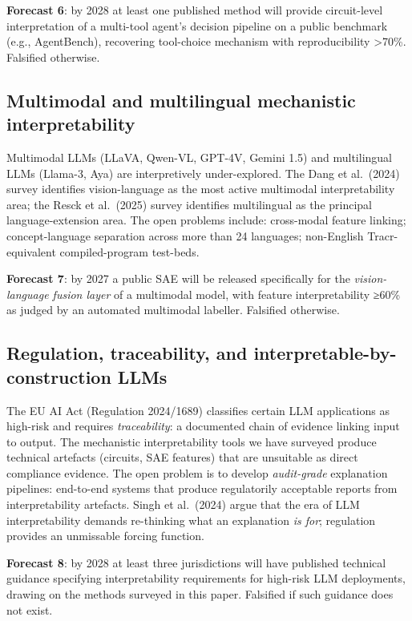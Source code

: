 \textbf{Forecast 6}: by 2028 at least one published method will provide circuit-level interpretation of a multi-tool agent's decision pipeline on a public benchmark (e.g., AgentBench), recovering tool-choice mechanism with reproducibility \textgreater70\%. Falsified otherwise.

\subsection{Multimodal and multilingual mechanistic interpretability}\label{multimodal-and-multilingual-mechanistic-interpretability}

Multimodal LLMs (LLaVA, Qwen-VL, GPT-4V, Gemini 1.5) and multilingual LLMs (Llama-3, Aya) are interpretively under-explored. The Dang et al.~(2024) survey identifies vision-language as the most active multimodal interpretability area; the Resck et al.~(2025) survey identifies multilingual as the principal language-extension area. The open problems include: cross-modal feature linking; concept-language separation across more than 24 languages; non-English Tracr-equivalent compiled-program test-beds.

\textbf{Forecast 7}: by 2027 a public SAE will be released specifically for the \emph{vision-language fusion layer} of a multimodal model, with feature interpretability ≥60\% as judged by an automated multimodal labeller. Falsified otherwise.

\subsection{Regulation, traceability, and interpretable-by-construction LLMs}\label{regulation-traceability-and-interpretable-by-construction-llms}

The EU AI Act (Regulation 2024/1689) classifies certain LLM applications as high-risk and requires \emph{traceability}: a documented chain of evidence linking input to output. The mechanistic interpretability tools we have surveyed produce technical artefacts (circuits, SAE features) that are unsuitable as direct compliance evidence. The open problem is to develop \emph{audit-grade} explanation pipelines: end-to-end systems that produce regulatorily acceptable reports from interpretability artefacts. Singh et al.~(2024) argue that the era of LLM interpretability demands re-thinking what an explanation \emph{is for}; regulation provides an unmissable forcing function.

\textbf{Forecast 8}: by 2028 at least three jurisdictions will have published technical guidance specifying interpretability requirements for high-risk LLM deployments, drawing on the methods surveyed in this paper. Falsified if such guidance does not exist.

